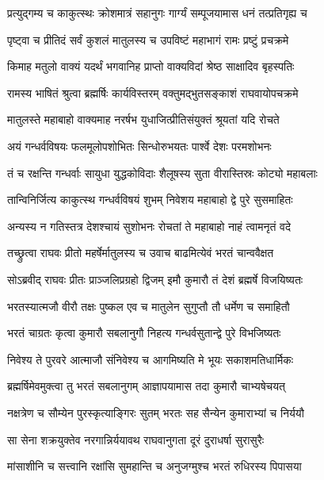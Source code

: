 \twolineshloka
{प्रत्युद्गम्य च काकुत्स्थः क्रोशमात्रं सहानुगः}
{गार्ग्यं सम्पूजयामास धनं तत्प्रतिगृह्य च} %

\twolineshloka
{पृष्ट्वा च प्रीतिदं सर्वं कुशलं मातुलस्य च}
{उपविष्टं महाभागं रामः प्रष्टुं प्रचक्रमे} %

\twolineshloka
{किमाह मतुलो वाक्यं यदर्थं भगवानिह}
{प्राप्तो वाक्यविदां श्रेष्ठ साक्षादिव बृहस्पतिः} %

\twolineshloka
{रामस्य भाषितं श्रुत्वा ब्रह्मर्षिः कार्यविस्तरम्}
{वक्तुमद्भुतसङ्काशं राघवायोपचक्रमे} %

\twolineshloka
{मातुलस्ते महाबाहो वाक्यमाह नरर्षभ}
{युधाजित्प्रीतिसंयुक्तं श्रूयतां यदि रोचते} %

\twolineshloka
{अयं गन्धर्वविषयः फलमूलोपशोभितः}
{सिन्धोरुभयतः पार्श्वे देशः परमशोभनः} %

\twolineshloka
{तं च रक्षन्ति गन्धर्वाः सायुधा युद्धकोविदाः}
{शैलूषस्य सुता वीरास्तिस्रः कोट्यो महाबलाः} %

\twolineshloka
{तान्विनिर्जित्य काकुत्स्थ गन्धर्वविषयं शुभम्}
{निवेशय महाबाहो द्वे पुरे सुसमाहितः} %

\twolineshloka
{अन्यस्य न गतिस्तत्र देशश्चायं सुशोभनः}
{रोचतां ते महाबाहो नाहं त्वामनृतं वदे} %

\twolineshloka
{तच्छ्रुत्वा राघवः प्रीतो महर्षेर्मातुलस्य च}
{उवाच बाढमित्येवं भरतं चान्ववैक्षत} %

\twolineshloka
{सोऽब्रवीद् राघवः प्रीतः प्राञ्जलिप्रग्रहो द्विजम्}
{इमौ कुमारौ तं देशं ब्रह्मर्षे विजयिष्यतः} %

\twolineshloka
{भरतस्यात्मजौ वीरौ तक्षः पुष्कल एव च}
{मातुलेन सुगुप्तौ तौ धर्मेण च समाहितौ} %

\twolineshloka
{भरतं चाग्रतः कृत्वा कुमारौ सबलानुगौ}
{निहत्य गन्धर्वसुतान्द्वे पुरे विभजिष्यतः} %

\twolineshloka
{निवेश्य ते पुरवरे आत्माजौ संनिवेश्य च}
{आगमिष्यति मे भूयः सकाशमतिधार्मिकः} %

\twolineshloka
{ब्रह्मर्षिमेवमुक्त्वा तु भरतं सबलानुगम्}
{आज्ञापयामास तदा कुमारौ चाभ्यषेचयत्} %

\twolineshloka
{नक्षत्रेण च सौम्येन पुरस्कृत्याङ्गिरः सुतम्}
{भरतः सह सैन्येन कुमाराभ्यां च निर्ययौ} %

\twolineshloka
{सा सेना शक्रयुक्तेव नरगान्निर्ययावथ}
{राघवानुगता दूरं दुराधर्षा सुरासुरैः} %

\twolineshloka
{मांसाशीनि च सत्त्वानि रक्षांसि सुमहान्ति च}
{अनुजग्मुश्च भरतं रुधिरस्य पिपासया} %

